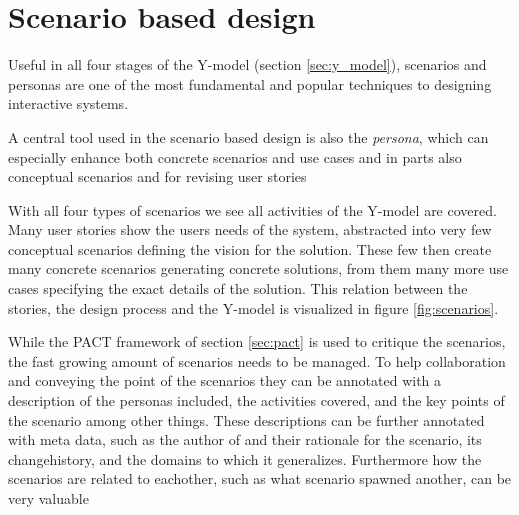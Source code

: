 \section{Scenario based design} \label{sec:scenario_based_design}
Useful in all four stages of the Y-model (section \ref{sec:y_model}), scenarios and personas are one of the most fundamental and popular techniques to designing interactive systems. \cite[p. 62]{benyon_14}






A central tool used in the scenario based design is also the \emph{persona}, which can especially enhance both concrete scenarios and use cases and in parts also conceptual scenarios and for revising user stories



With all four types of scenarios we see all activities of the Y-model are covered. Many user stories show the users needs of the system, abstracted into very few conceptual scenarios defining the vision for the solution. These few then create many concrete scenarios generating concrete solutions, from them many more use cases specifying the exact details of the solution. This relation between the stories, the design process and the Y-model is visualized in figure \ref{fig:scenarios}.





While the PACT framework of section \ref{sec:pact} is used to critique the scenarios, the fast growing amount of scenarios needs to be managed. To help collaboration and conveying the point of the scenarios they can be annotated with a description of the personas included, the activities covered, and the key points of the scenario among other things. These descriptions can be further annotated with meta data, such as the author of and their rationale for the scenario, its changehistory, and the domains to which it generalizes. Furthermore how the scenarios are related to eachother, such as what scenario spawned another, can be very valuable \cite[p. 70,72]{benyon_14}



